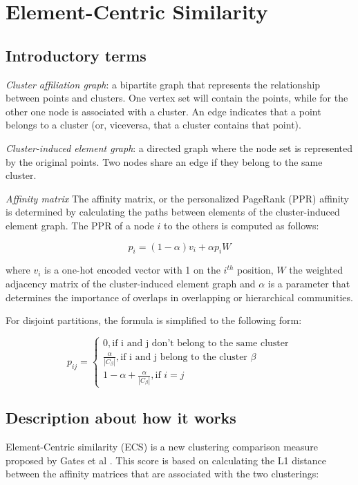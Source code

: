 \section{Element-Centric Similarity}
    \subsection{Introductory terms}
    \textit{Cluster affiliation graph}: a bipartite graph that represents the relationship between points and clusters. One vertex set will contain the points, while for the other one node is associated with a cluster. An edge indicates that a point belongs to a cluster (or, viceversa, that a cluster contains that point).
    
    \textit{Cluster-induced element graph}: a directed graph where the node set is represented by the original points. Two nodes share an edge if they belong to the same cluster.

    \textit{Affinity matrix} The affinity matrix, or the personalized PageRank (PPR) affinity is determined by calculating the paths between elements of the cluster-induced element graph. The PPR of a node $i$ to the others is computed as follows:

    \[ p_i = (1 - \alpha) v_i + \alpha p_i W \]

    where $v_i$ is a one-hot encoded vector with 1 on the $i^{th}$ position, $W$ the weighted adjacency matrix of the cluster-induced element graph and $\alpha$ is a parameter that determines the importance of overlaps in overlapping or hierarchical communities.

    For disjoint partitions, the formula is simplified to the following form:

    \[ 
        p_{ij} = 
        \begin{cases}
            0, \text{if i and j don't belong to the same cluster} \\
            \frac{\alpha}{|C_\beta|}, \text{if i and j belong to the cluster } \beta \\
            1 - \alpha + \frac{\alpha}{|C_\beta|}, \text{if } i = j
        \end{cases}
    \]
    
    \subsection{Description about how it works}

    Element-Centric similarity (ECS) is a new clustering comparison measure proposed by Gates et al \cite{Gates2019}. This score is based on calculating the L1 distance between the affinity matrices that are associated with the two clusterings:

